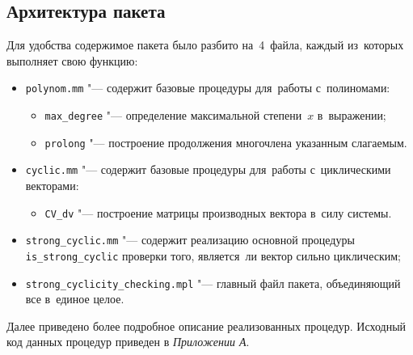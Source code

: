 \newpage

\subsection{Архитектура пакета}

Для удобства содержимое пакета было разбито на~4~файла, каждый из~которых выполняет свою функцию:

\begin{itemize}
    \item
        \verb|polynom.mm| "--- содержит базовые процедуры для~работы с~полиномами:
        \begin{itemize}
            \item
                \verb|max_degree| "--- определение максимальной степени~$x$ в~выражении;
            \item
                \verb|prolong| "--- построение продолжения многочлена указанным слагаемым.
        \end{itemize}
    \item
        \verb|cyclic.mm| "--- содержит базовые процедуры для~работы с~циклическими векторами:
        \begin{itemize}
            \item
                \verb|CV_dv| "--- построение матрицы производных вектора в~силу системы.
        \end{itemize}
    \item
        \verb|strong_cyclic.mm| "--- содержит реализацию основной процедуры \verb|is_strong_cyclic| проверки того,
        является~ли вектор сильно циклическим;
    \item
        \verb|strong_cyclicity_checking.mpl| "--- главный файл пакета, объединяющий все в~единое целое.
\end{itemize}

Далее приведено более подробное описание реализованных процедур.
Исходный код данных процедур приведен в \emph{Приложении А}.

